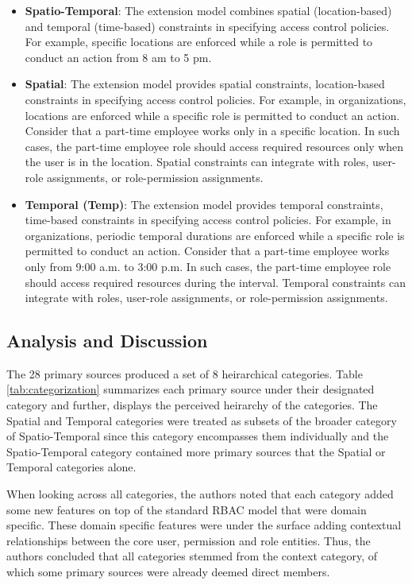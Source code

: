 \begin{itemize}
  \item \textbf{Spatio-Temporal}: The extension model combines spatial (location-based) and temporal (time-based) constraints in specifying access control policies. For example, specific locations are enforced while a role is permitted to conduct an action from 8 am to 5 pm.

  \item \textbf{Spatial}: The extension model provides spatial constraints, location-based constraints in specifying access
	control policies. For example, in organizations, locations are enforced while a
	specific role is permitted to conduct an action. Consider that a part-time employee works only in a specific location.
	In such cases, the part-time employee role should access required resources only when the user is in the location. 
	Spatial constraints can integrate with roles, user-role assignments, or role-permission assignments. 

  \item \textbf{Temporal (Temp)}:  The extension model provides temporal constraints, time-based constraints in specifying access
	control policies. For example, in organizations, periodic temporal durations are enforced while a
	specific role is permitted to conduct an action. Consider that a part-time employee works only from 9:00 a.m. to 3:00 p.m.
	In such cases, the part-time employee role should access required resources during the interval. 
	Temporal constraints can integrate with roles, user-role assignments, or role-permission assignments.   
	
\end{itemize}

\subsection{Analysis and Discussion}

The 28 primary sources produced a set of 8 heirarchical categories. Table \ref{tab:categorization} summarizes each primary source under their designated
category and further, displays the perceived heirarchy of the categories. 
The Spatial and Temporal categories were treated as subsets of the broader category of Spatio-Temporal since this category encompasses them individually and
the Spatio-Temporal category contained more primary sources that the Spatial or Temporal categories alone.  

When looking across all categories, the authors noted that each category added some new features on top of the standard RBAC model that were domain specific.
These domain specific features were under the surface adding contextual relationships between the core user, permission and role entities.  Thus, the authors
concluded that all categories stemmed from the context category, of which some primary sources were already deemed direct members.  

